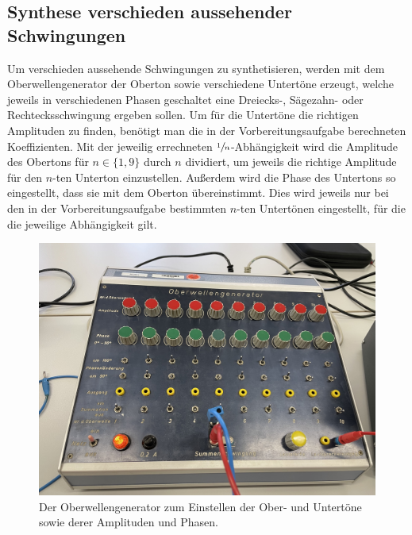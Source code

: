 \subsection{Synthese verschieden aussehender Schwingungen}
Um verschieden aussehende Schwingungen zu synthetisieren, werden mit dem Oberwellengenerator der Oberton sowie verschiedene
Untertöne erzeugt, welche jeweils in verschiedenen Phasen geschaltet eine Dreiecks-, Sägezahn- oder Rechtecksschwingung
ergeben sollen. Um für die Untertöne die richtigen Amplituden zu finden, benötigt man die in der Vorbereitungsaufgabe berechneten 
Koeffizienten. Mit der jeweilig errechneten $\sfrac{1}{n}$-Abhängigkeit wird die Amplitude des Obertons für $n\in\{1,9\}$ durch $n$ dividiert, um 
jeweils die richtige Amplitude für den $n$-ten Unterton einzustellen. Außerdem wird die Phase des Untertons so eingestellt, dass sie mit
dem Oberton übereinstimmt. Dies wird jeweils nur bei den in der Vorbereitungsaufgabe bestimmten $n$-ten 
Untertönen eingestellt, für die die jeweilige Abhängigkeit gilt.
\begin{figure}
    \includegraphics[scale=0.1]{Messdaten_Bilder/Oberwellengenerator.jpeg}
    \caption{Der Oberwellengenerator zum Einstellen der Ober- und Untertöne sowie derer Amplituden und Phasen.}
    \label{fig:Oberwelle}
\end{figure}
